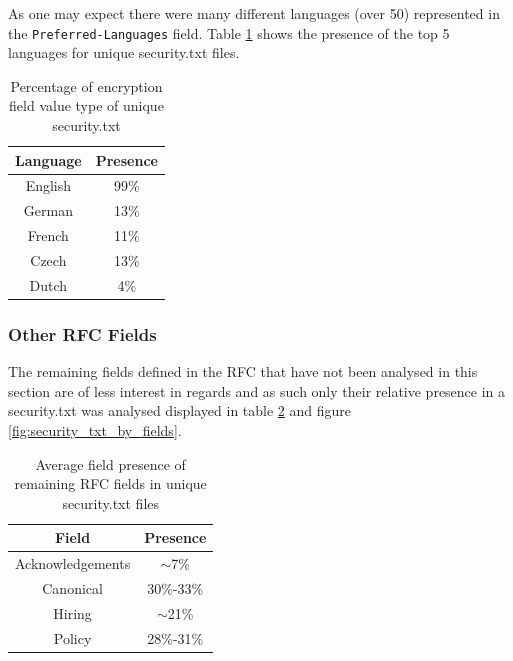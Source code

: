 \documentclass{mscreport}
\begin{document}
As one may expect there were many different languages (over 50) represented in the \texttt{Preferred-Languages} field. Table \ref{table:security_txt_preferred_languages} shows the presence of the top 5 languages for unique security.txt files.

\begin{table}[H]
  \begin{center}
    \begin{tabular}{|c|c|}  %
      \hline
      \textbf{Language} & \textbf{Presence}\\
      \hline
      English & 99\%\\
      \hline
      German & 13\%\\
      \hline
      French & 11\%\\
      \hline
      Czech  & 13\%\\
      \hline
      Dutch & 4\%\\
      \hline
    \end{tabular}
    \caption{Percentage of encryption field value type of unique security.txt}
    \label{table:security_txt_preferred_languages} %
  \end{center}
\end{table}


\subsubsection{Other RFC Fields}

The remaining fields defined in the RFC that have not been analysed in this section are of less interest in regards and as such only their relative presence in a security.txt was analysed displayed in table \ref{table:security_txt_by_other_rfc_fields} and figure \ref{fig:security_txt_by_fields}.

\begin{table}[H]
  \begin{center}
    \begin{tabular}{|c|c|}  %
      \hline
      \textbf{Field} & \textbf{Presence}\\
      \hline
      Acknowledgements & $\sim$7\%\\
      \hline
      Canonical & 30\%-33\%\\
      \hline
      Hiring & $\sim$21\%\\
      \hline
      Policy & 28\%-31\%\\
      \hline
    \end{tabular}
    \caption{Average field presence of remaining RFC fields in unique security.txt files}
    \label{table:security_txt_by_other_rfc_fields} %
  \end{center}
\end{table}
\end{document}

